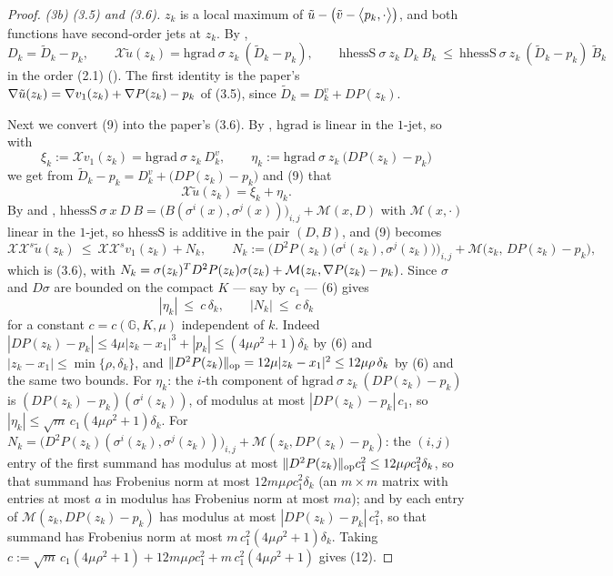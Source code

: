 \begin{proof}
\emph{(3b) (3.5) and (3.6).} $z_k$ is a local maximum of
$\tilde u-\big(\tilde v-\big\langle p_k,\cdot\big\rangle\big)$, and both functions have second-order jets
at $z_k$. By ,
\[
 D_k=\tilde D_k-p_k,\qquad
 \mathcal X\tilde u(z_k)=\mathrm{hgrad}\ \sigma\ z_k\ (\tilde D_k-p_k),\qquad
 \mathrm{hhessS}\ \sigma\ z_k\ D_k\ B_k\ \le\
 \mathrm{hhessS}\ \sigma\ z_k\ (\tilde D_k-p_k)\ \tilde B_k \tag{9}
\]
in the order (2.1) (). The first identity is the paper's
$\nabla\tilde u(z_k)=\nabla v_1(z_k)+\nabla P(z_k)-p_k$ of (3.5), since
$\tilde D_k=D^{v}_k+DP(z_k)$.

Next we convert (9) into the paper's (3.6). By , $\mathrm{hgrad}$ is
linear in the $1$-jet, so with
\[
 \xi_k:=\mathcal Xv_1(z_k)=\mathrm{hgrad}\ \sigma\ z_k\ D^{v}_k,\qquad
 \eta_k:=\mathrm{hgrad}\ \sigma\ z_k\ \big(DP(z_k)-p_k\big)
\]
we get from $\tilde D_k-p_k=D^{v}_k+\big(DP(z_k)-p_k\big)$ and (9) that
\[
 \mathcal X\tilde u(z_k)=\xi_k+\eta_k . \tag{10}
\]
By  and ,
$\mathrm{hhessS}\ \sigma\ x\ D\ B=\big(B(\sigma^{i}(x),\sigma^{j}(x))\big)_{i,j}+\mathcal M(x,D)$
with $\mathcal M(x,\cdot)$ linear in the $1$-jet, so $\mathrm{hhessS}$ is additive in the
pair $(D,B)$, and (9) becomes
\[
 \mathcal X\mathcal X^{s}\tilde u(z_k)\ \le\ \mathcal X\mathcal X^{s}v_1(z_k)+N_k,\qquad
 N_k:=\Big(D^{2}P(z_k)\big(\sigma^{i}(z_k),\sigma^{j}(z_k)\big)\Big)_{i,j}
  +\mathcal M\big(z_k,\,DP(z_k)-p_k\big), \tag{11}
\]
which is (3.6), with $N_k=\sigma(z_k)^{T}D^{2}P(z_k)\sigma(z_k)+\mathcal M(z_k,\nabla P(z_k)-p_k)$.
Since $\sigma$ and $D\sigma$ are bounded on the compact $K$ --- say by $c_1$ --- (6) gives
\[
 |\eta_k|\ \le\ c\,\delta_k,\qquad |N_k|\ \le\ c\,\delta_k \tag{12}
\]
for a constant $c=c(\mathbb G,K,\mu)$ independent of $k$. Indeed
$|DP(z_k)-p_k|\le4\mu|z_k-x_1|^{3}+|p_k|\le(4\mu\rho^{2}+1)\delta_k$ by (6) and
$|z_k-x_1|\le\min\{\rho,\delta_k\}$, and
$\|D^{2}P(z_k)\|_{\rm op}=12\mu|z_k-x_1|^{2}\le12\mu\rho\,\delta_k$ by (6) and the same
two bounds. For $\eta_k$: the $i$-th component of
$\mathrm{hgrad}\ \sigma\ z_k\ (DP(z_k)-p_k)$ is $(DP(z_k)-p_k)(\sigma^{i}(z_k))$, of modulus
at most $|DP(z_k)-p_k|\,c_1$, so $|\eta_k|\le\sqrt m\,c_1(4\mu\rho^{2}+1)\delta_k$. For
$N_k=\big(D^{2}P(z_k)(\sigma^{i}(z_k),\sigma^{j}(z_k))\big)_{i,j}+\mathcal M(z_k,DP(z_k)-p_k)$:
the $(i,j)$ entry of the first summand has modulus at most
$\|D^{2}P(z_k)\|_{\rm op}c_1^{2}\le12\mu\rho c_1^{2}\delta_k$, so that summand has
Frobenius norm at most $12m\mu\rho c_1^{2}\delta_k$ (an $m\times m$ matrix with entries at
most $a$ in modulus has Frobenius norm at most $ma$); and by \noderef{Mfield} each entry of
$\mathcal M(z_k,DP(z_k)-p_k)$ has modulus at most $|DP(z_k)-p_k|\,c_1^{2}$, so that summand
has Frobenius norm at most $m\,c_1^{2}(4\mu\rho^{2}+1)\delta_k$. Taking
$c:=\sqrt m\,c_1(4\mu\rho^{2}+1)+12m\mu\rho c_1^{2}+m\,c_1^{2}(4\mu\rho^{2}+1)$ gives (12).


\end{proof}
